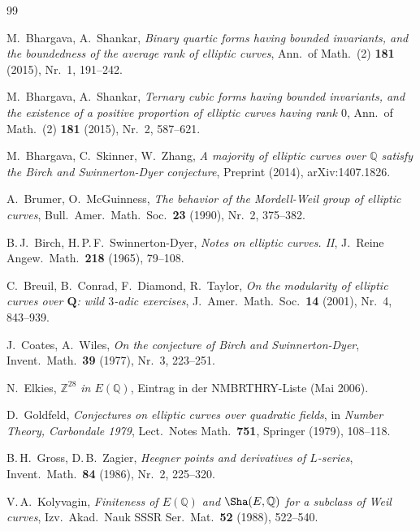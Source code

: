 \documentclass[12pt,a4paper]{amsart}
\theoremstyle{definition}
\theoremstyle{remark}
\begin{document}
\begin{thebibliography}{99}

M.\ Bhargava, A.\ Shankar,
\textit{Binary quartic forms having bounded invariants, and the boundedness of the
average rank of elliptic curves},
Ann.\ of Math.\ (2) \textbf{181} (2015), Nr.\ 1, 191--242.

M.\ Bhargava, A.\ Shankar,
\textit{Ternary cubic forms having bounded invariants, and the existence of a positive
proportion of elliptic curves having rank $0$},
Ann.\ of Math.\ (2) \textbf{181} (2015), Nr.\ 2, 587--621.

M.\ Bhargava, C.\ Skinner, W.\ Zhang,
\textit{A majority of elliptic curves over $\mathbb{Q}$ satisfy the Birch and
Swinnerton-Dyer conjecture},
Preprint (2014), arXiv:1407.1826.

A.\ Brumer, O.\ McGuinness,
\textit{The behavior of the Mordell-Weil group of elliptic curves},
Bull.\ Amer.\ Math.\ Soc.\ \textbf{23} (1990), Nr.\ 2, 375--382.

B.\,J.\ Birch, H.\,P.\,F.\ Swinnerton-Dyer,
\textit{Notes on elliptic curves. II},
J.\ Reine Angew.\ Math.\ \textbf{218} (1965), 79--108.

C.\ Breuil, B.\ Conrad, F.\ Diamond, R.\ Taylor,
\textit{On the modularity of elliptic curves over $\mathbf{Q}$: wild $3$-adic exercises},
J.\ Amer.\ Math.\ Soc.\ \textbf{14} (2001), Nr.\ 4, 843--939.

J.\ Coates, A.\ Wiles,
\textit{On the conjecture of Birch and Swinnerton-Dyer},
Invent.\ Math.\ \textbf{39} (1977), Nr.\ 3, 223--251.

N.\ Elkies,
\textit{$\mathbb{Z}^{28}$ in $E(\mathbb{Q})$},
Eintrag in der NMBRTHRY-Liste (Mai 2006).

D.\ Goldfeld,
\textit{Conjectures on elliptic curves over quadratic fields},
in \textit{Number Theory, Carbondale 1979}, Lect.\ Notes Math.\ \textbf{751},
Springer (1979), 108--118.

B.\,H.\ Gross, D.\,B.\ Zagier,
\textit{Heegner points and derivatives of $L$-series},
Invent.\ Math.\ \textbf{84} (1986), Nr.\ 2, 225--320.

V.\,A.\ Kolyvagin,
\textit{Finiteness of $E(\mathbb{Q})$ and $\Sha(E,\mathbb{Q})$ for a subclass of
Weil curves},
Izv.\ Akad.\ Nauk SSSR Ser.\ Mat.\ \textbf{52} (1988), 522--540.


\end{thebibliography}
\end{document}
